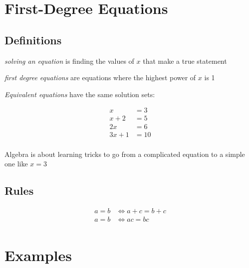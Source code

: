 \documentclass[letterpaper, landscape]{exam}
\begin{document}
    \section{First-Degree Equations} %
  
    \subsection{Definitions} %
    
    \begin{itemize*}
      \item {\em solving an equation\/} is finding the values of $x$ that make a true statement
      \item {\em first degree equations\/} are equations where the highest power of $x$ is 1
    \end{itemize*}
  
    {\em Equivalent equations\/} have the same solution sets:
  
    \begin{align*}
      x      & = 3 \\
      x + 2  & = 5 \\
      2x     & = 6 \\
      3x + 1 & = 10 \\
    \end{align*}
  
    Algebra is about learning tricks to go from a complicated equation to a simple one like $x = 3$
    
    \subsection{Rules} %
    
    \begin{align*}
        a = b & \iff a + c = b + c \\
        a = b & \iff ac = bc \\
    \end{align*}
  
    \section{Examples} %
    
\end{document}
